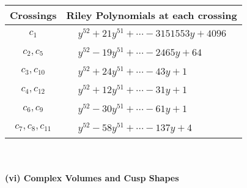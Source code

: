 \documentclass[1p]{elsarticle_modified}
\theoremstyle{definition}
\begin{document}
\begin{tabular}{m{50pt}|m{274pt}}
Crossings & \hspace{64pt}Riley Polynomials at each crossing \\
\hline $$\begin{aligned}c_{1}\end{aligned}$$&$\begin{aligned}
&y^{52}+21 y^{51}+\cdots-3151553 y+4096
\end{aligned}$\\
\hline $$\begin{aligned}c_{2},c_{5}\end{aligned}$$&$\begin{aligned}
&y^{52}-19 y^{51}+\cdots-2465 y+64
\end{aligned}$\\
\hline $$\begin{aligned}c_{3},c_{10}\end{aligned}$$&$\begin{aligned}
&y^{52}+24 y^{51}+\cdots-43 y+1
\end{aligned}$\\
\hline $$\begin{aligned}c_{4},c_{12}\end{aligned}$$&$\begin{aligned}
&y^{52}+12 y^{51}+\cdots-31 y+1
\end{aligned}$\\
\hline $$\begin{aligned}c_{6},c_{9}\end{aligned}$$&$\begin{aligned}
&y^{52}-30 y^{51}+\cdots-61 y+1
\end{aligned}$\\
\hline $$\begin{aligned}c_{7},c_{8},c_{11}\end{aligned}$$&$\begin{aligned}
&y^{52}-58 y^{51}+\cdots-137 y+4
\end{aligned}$\\
\hline
\end{tabular}\\~\\
\newpage\flushleft \textbf{(vi) Complex Volumes and Cusp Shapes}
\end{document}
